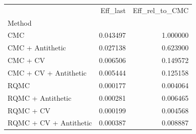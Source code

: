 \begin{tabular}{lrr}
\toprule
 & Eff_last & Eff_rel_to_CMC \\
Method &  &  \\
\midrule
CMC & 0.043497 & 1.000000 \\
CMC + Antithetic & 0.027138 & 0.623900 \\
CMC + CV & 0.006506 & 0.149572 \\
CMC + CV + Antithetic & 0.005444 & 0.125158 \\
RQMC & 0.000177 & 0.004064 \\
RQMC + Antithetic & 0.000281 & 0.006465 \\
RQMC + CV & 0.000199 & 0.004568 \\
RQMC + CV + Antithetic & 0.000387 & 0.008887 \\
\bottomrule
\end{tabular}
